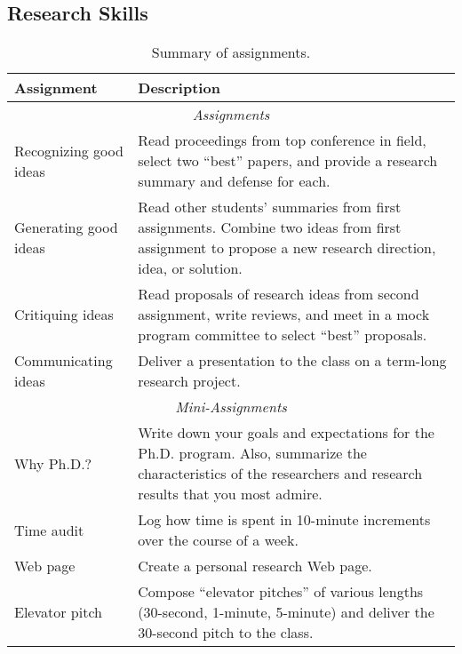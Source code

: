 \subsection{Research Skills}

\begin{table}[t]
\begin{center}
\begin{small}
\begin{tabular}{l|p{2in}}
{\bf Assignment} & {\bf Description} \\ \hline
\multicolumn{2}{c}{{\em Assignments}} \\ \hline
Recognizing good ideas & Read proceedings from top conference in field,
select two ``best'' papers, and provide a research summary and defense
for each. \\
Generating good ideas & Read other students' summaries from first
assignments.  Combine two ideas from first assignment to propose a new
research direction, idea, or solution. \\ 
Critiquing ideas & Read proposals of research ideas from second
assignment, write reviews, and meet in a mock program committee to
select ``best'' proposals. \\
Communicating ideas & Deliver a presentation to the class on a term-long
research project.  \\ \hline
\multicolumn{2}{c}{{\em Mini-Assignments}} \\ \hline
Why Ph.D.? & Write down your goals and expectations for the
Ph.D. program.  Also, summarize the characteristics of the researchers
and research results that you most admire. \\
Time audit & Log how time is spent in 10-minute increments over the
course of a week. \\
Web page & Create a personal research Web page. \\
Elevator pitch & Compose ``elevator pitches'' of various lengths
(30-second, 1-minute,  5-minute) and deliver the 30-second pitch to the
class. 
\end{tabular}
\end{small}
\end{center}
\vspace*{-0.1in}
\caption{Summary of assignments.}
\vspace*{-0.2in}
\label{tab:assignments}
\end{table}

